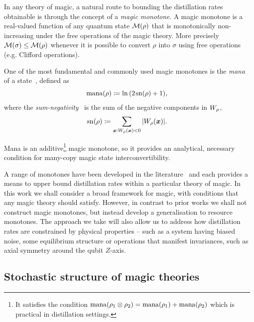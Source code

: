 \documentclass[pra,
aps,
twocolumn,
superscriptaddress,
groupedaddress,
nofootinbib,
reprint
]{revtex4-1}
\begin{document}
In any theory of magic, a natural route to bounding the distillation rates obtainable is through the concept of a \emph{magic monotone}. A magic monotone is a real-valued function of any quantum state $\mathcal{M}(\rho)$ that is monotonically non-increasing under the free operations of the magic theory. More precisely $\mathcal{M}(\sigma) \le \mathcal{M}(\rho)$ whenever it is possible to convert $\rho$ into $\sigma$ using free operations (e.g. Clifford operations).

One of the most fundamental and commonly used magic monotones is the \emph{mana} of a state~\cite{cit:veitch2}, defined as
\begin{equation}
    {{\rm{mana}}(\rho)} \coloneqq \ln{(2\hspace{1pt} {{\rm{sn}}(\rho)} +1)},
\end{equation}
where the \emph{sum-negativity}~\cite{cit:veitch2} is the sum of the negative components in $\W{\rho}$,
\begin{equation}
    \sn{\rho} \coloneqq \sum\limits_{\bmx: \W[\bmx]{\rho} < 0} \abs{\W[\bmx]{\rho}}.
\end{equation}

Mana is an additive\footnote{It satisfies the condition ${{\rm{mana}}(\rho_1 \otimes \rho_2)} = {{\rm{mana}}(\rho_1)} + {{\rm{mana}}(\rho_2)}$ which is practical in distillation settings.} magic monotone, so it provides an analytical, necessary condition for many-copy magic state interconvertibility.

A range of monotones have been developed in the literature~\cite{cit:howard, Wang_2020, Seddon_2021} and each provides a means to upper bound distillation rates within a particular theory of magic. In this work we shall consider a broad framework for magic, with conditions that any magic theory should satisfy. However, in contrast to prior works we shall not construct magic monotones, but instead develop a generalisation to resource monotones. The approach we take will also allow us to address how distillation rates are constrained by physical properties -- such as a system having biased noise, some equilibrium structure or operations that manifest invariances, such as axial symmetry around the qubit $Z$-axis.




\subsection{Stochastic structure of magic theories}
\label{sec:struc}
\end{document}
